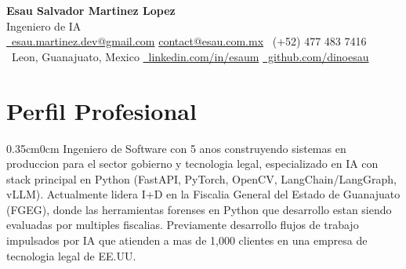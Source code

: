 \documentclass[a4paper, 10pt]{article}
\begin{document}
\begin{center}
  {\fontsize{20}{22}\selectfont\textbf{Esau Salvador Martinez Lopez}} \\[2pt]
  {\large Ingeniero de IA} \\[6pt]
  {\small
    \href{mailto:esau.martinez.dev@gmail.com}{\faEnvelope\ esau.martinez.dev@gmail.com}
    \quad\textbar\quad
    \href{mailto:contact@esau.com.mx}{contact@esau.com.mx}
    \quad\textbar\quad
    \faPhone\ (+52) 477 483 7416
  } \\[2pt]
  {\small
    \faMapMarker*\ Leon, Guanajuato, Mexico
    \quad\textbar\quad
    \href{https://linkedin.com/in/esaum}{\faLinkedin\ linkedin.com/in/esaum}
    \quad\textbar\quad
    \href{https://github.com/dinoesau}{\faGithub\ github.com/dinoesau}
  }
\end{center}

\vspace{0.1cm}

\section{Perfil Profesional}
\begin{adjustwidth}{0.35cm}{0cm}
Ingeniero de Software con 5 anos construyendo sistemas en produccion para el sector gobierno y tecnologia legal, especializado en IA con stack principal en Python (FastAPI, PyTorch, OpenCV, LangChain/LangGraph, vLLM). Actualmente lidera I+D en la Fiscalia General del Estado de Guanajuato (FGEG), donde las herramientas forenses en Python que desarrollo estan siendo evaluadas por multiples fiscalias. Previamente desarrollo flujos de trabajo impulsados por IA que atienden a mas de 1,000 clientes en una empresa de tecnologia legal de EE.UU.
\end{adjustwidth}
\end{document}
